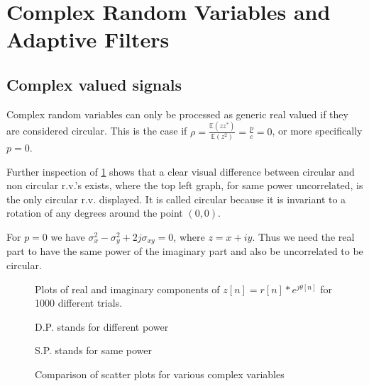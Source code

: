 \documentclass[10pt,twoside,a4paper]{report}
\begin{document}
\section{Complex Random Variables and Adaptive Filters}
\subsection{Complex valued signals}
Complex random variables can only be processed as generic real valued if they are considered circular. This is the case if $\rho=\frac{\mathbb{E}(zz^*)}{\mathbb{E}(z^2)}=\frac{p}{c}=0$, or more specifically $p=0$. 

 Further inspection of \ref{fig:4_2a} shows that a clear visual difference between circular and non circular r.v.'s exists, where the top left graph, for same power uncorrelated, is the only circular r.v. displayed. It is called circular because it is invariant to a rotation of any degrees around the point $(0,0)$.
 
 For $p=0$ we have $\sigma_x^2 - \sigma_y^2 +2j\sigma_{xy}=0$, where $z=x+iy$. Thus we need the real part to have the same power of the imaginary part and also be uncorrelated to be circular. 
\FloatBarrier
\begin{figure}[h]
\centering
\resizebox{\textwidth}{!}{}
Plots of real and imaginary components of $z[n]=r[n]*e^{j\theta [n]}$ for 1000 different trials.

D.P. stands for different power

S.P. stands for same power
\caption{Comparison of scatter plots for various complex variables}
\label{fig:4_2a}
\end{figure}
\end{document}
